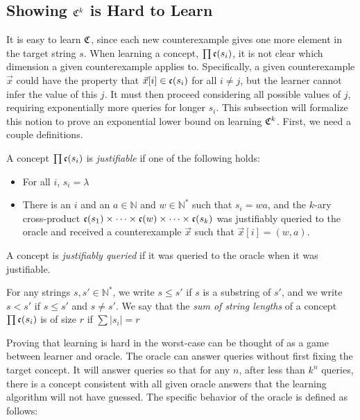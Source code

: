 \subsection{Showing $\mathfrak{C}^k$ is Hard to Learn}

It is easy to learn $\mathfrak{C}$, since each new counterexample gives one more element in the target string $s$. 
When learning a concept, $\prod \mathfrak{c}(s_i)$, it is not clear which dimension a given counterexample applies to. 
Specifically, a given counterexample $\vec{x}$ could have the property that $\vec{x}[i] \in \mathfrak{c}(s_i)$ for all $i \ne j$, but the learner cannot infer the value of this $j$. 
It must then proceed considering all possible values of $j$, requiring exponentially more queries for longer $s_i$.  
This subsection will formalize this notion to prove an exponential lower bound on learning $\mathfrak{C}^k$. 
First, we need a couple definitions. 


A concept $\prod \mathfrak{c}(s_i)$ is \emph{justifiable} if one of the following holds:
\begin{itemize}
\item For all $i$, $s_i = \lambda$
\item There is an $i$ and an $a \in \mathbb{N}$ and $w \in \mathbb{N}^*$ such that $s_i = wa$, and the $k$-ary cross-product $\mathfrak{c}(s_1) \times \dots \times \mathfrak{c}(w) \times \dots \times \mathfrak{c}(s_k)$ was justifiably queried to the oracle and received a counterexample $\vec{x}$ such that $\vec{x}[i] = (w, a)$. 
\end{itemize}

A concept is \emph{justifiably queried} if it was queried to the oracle when it was justifiable. 
\newline

For any strings $s,s' \in \mathbb{N}^*$, we write $s \le s'$ if $s$ is a substring of $s'$, and we write $s < s'$ if $s \le s'$ and $s \ne s'$.
We say that the \emph{sum of string lengths} of a concept $\prod \mathfrak{c}(s_i)$ is of size $r$ if $\sum |s_i| = r$

Proving that learning is hard in the worst-case can be thought of as a game between learner and oracle. 
The oracle can answer queries without first fixing the target concept. 
It will answer queries so that for any $n$, after less than $k^n$ queries, there is a concept consistent with all given oracle answers that the learning algorithm will not have guessed. 
The specific behavior of the oracle is defined as follows:

